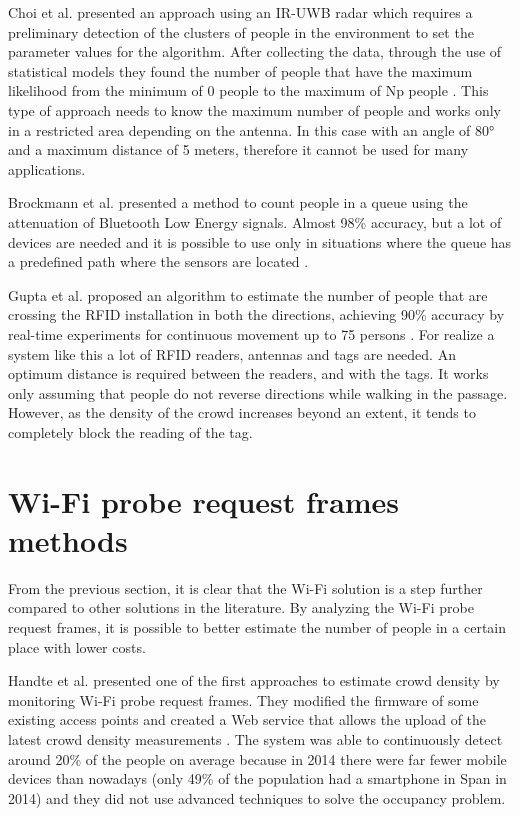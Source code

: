 Choi et al. presented an approach using an IR-UWB radar which requires a preliminary detection of the clusters of people in the environment to set the parameter values for the algorithm. After collecting the data, through the use of statistical models they found the number of people that have the maximum likelihood from the minimum of 0 people to the maximum of Np people \cite{choi2017people}. 
This type of approach needs to know the maximum number of people and works only in a restricted area depending on the antenna. In this case with an angle of \ang{80} and a maximum distance of 5 meters, therefore it cannot be used for many applications.

Brockmann et al. presented a method to count people in a queue using the attenuation of Bluetooth Low Energy signals. Almost 98\% accuracy, but a lot of devices are needed and it is possible to use only in situations where the queue has a predefined path where the sensors are located \cite{brockmann2018cutiqueue}.

Gupta et al. proposed an algorithm to estimate the number of people that are crossing the RFID installation in both the directions, achieving 90\% accuracy by real-time experiments for continuous movement up to 75 persons \cite{gupta2018device}. For realize a system like this a lot of RFID readers, antennas and tags are needed. An optimum distance is required between the readers, and with the tags. It works only assuming that people do not reverse directions while walking in the passage. However, as the density of the crowd increases beyond an extent, it tends to completely block the reading of the tag.


\section{Wi-Fi probe request frames methods}
\label{sec:probe}
\vspace{0.2 cm}

From the previous section, it is clear that the Wi-Fi solution is a step further compared to other solutions in the literature. By analyzing the Wi-Fi probe request frames, it is possible to better estimate the number of people in a certain place with lower costs.

Handte et al. presented one of the first approaches to estimate crowd density by monitoring Wi-Fi probe request frames. They modified the firmware of some existing access points and created a Web service that allows the upload of the latest crowd density measurements \cite{handte2014crowd}. The system was able to continuously detect around 20\% of the people on average because in 2014 there were far fewer mobile devices than nowadays (only 49\% of the population had a smartphone in Span in 2014) and they did not use advanced techniques to solve the occupancy problem.

